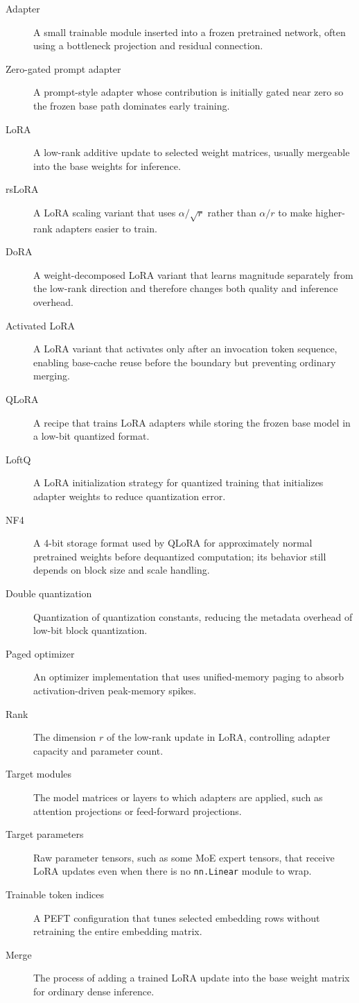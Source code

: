 \begin{description}
\item[Adapter] A small trainable module inserted into a frozen pretrained network, often using a bottleneck projection and residual connection.
\item[Zero-gated prompt adapter] A prompt-style adapter whose contribution is initially gated near zero so the frozen base path dominates early training.
\item[LoRA] A low-rank additive update to selected weight matrices, usually mergeable into the base weights for inference.
\item[rsLoRA] A LoRA scaling variant that uses $\alpha/\sqrt{r}$ rather than $\alpha/r$ to make higher-rank adapters easier to train.
\item[DoRA] A weight-decomposed LoRA variant that learns magnitude separately from the low-rank direction and therefore changes both quality and inference overhead.
\item[Activated LoRA] A LoRA variant that activates only after an invocation token sequence, enabling base-cache reuse before the boundary but preventing ordinary merging.
\item[QLoRA] A recipe that trains LoRA adapters while storing the frozen base model in a low-bit quantized format.
\item[LoftQ] A LoRA initialization strategy for quantized training that initializes adapter weights to reduce quantization error.
\item[NF4] A 4-bit storage format used by QLoRA for approximately normal pretrained weights before dequantized computation; its behavior still depends on block size and scale handling.
\item[Double quantization] Quantization of quantization constants, reducing the metadata overhead of low-bit block quantization.
\item[Paged optimizer] An optimizer implementation that uses unified-memory paging to absorb activation-driven peak-memory spikes.
\item[Rank] The dimension $r$ of the low-rank update in LoRA, controlling adapter capacity and parameter count.
\item[Target modules] The model matrices or layers to which adapters are applied, such as attention projections or feed-forward projections.
\item[Target parameters] Raw parameter tensors, such as some MoE expert tensors, that receive LoRA updates even when there is no \texttt{nn.Linear} module to wrap.
\item[Trainable token indices] A PEFT configuration that tunes selected embedding rows without retraining the entire embedding matrix.
\item[Merge] The process of adding a trained LoRA update into the base weight matrix for ordinary dense inference.
\end{description}

